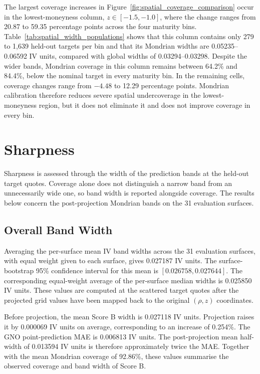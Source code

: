The largest coverage increases in Figure~\ref{fig:spatial_coverage_comparison} occur in the lowest-moneyness column, $z\in[-1.5,-1.0]$, where the change ranges from 20.87 to 59.35 percentage points across the four maturity bins. Table~\ref{tab:spatial_width_populations} shows that this column contains only 279 to 1{,}639 held-out targets per bin and that its Mondrian widths are 0.05235--0.06592 IV units, compared with global widths of 0.03294--0.03298. Despite the wider bands, Mondrian coverage in this column remains between 64.2\% and 84.4\%, below the nominal target in every maturity bin. In the remaining cells, coverage changes range from $-4.48$ to 12.29 percentage points. Mondrian calibration therefore reduces severe spatial undercoverage in the lowest-moneyness region, but it does not eliminate it and does not improve coverage in every bin.

\section{Sharpness}
\label{sec:exp_sharpness}

Sharpness is assessed through the width of the prediction bands at the held-out target quotes. Coverage alone does not distinguish a narrow band from an unnecessarily wide one, so band width is reported alongside coverage. The results below concern the post-projection Mondrian bands on the 31 evaluation surfaces.

\subsection{Overall Band Width}
\label{subsec:exp_width_overall}

Averaging the per-surface mean IV band widths across the 31 evaluation surfaces, with equal weight given to each surface, gives 0.027187 IV units. The surface-bootstrap 95\% confidence interval for this mean is $[0.026758,0.027644]$. The corresponding equal-weight average of the per-surface median widths is 0.025850 IV units. These values are computed at the scattered target quotes after the projected grid values have been mapped back to the original $(\rho,z)$ coordinates.

Before projection, the mean Score B width is 0.027118 IV units. Projection raises it by 0.000069 IV units on average, corresponding to an increase of 0.254\%. The GNO point-prediction MAE is 0.006813 IV units. The post-projection mean half-width of 0.013594 IV units is therefore approximately twice the MAE. Together with the mean Mondrian coverage of 92.86\%, these values summarise the observed coverage and band width of Score B.

